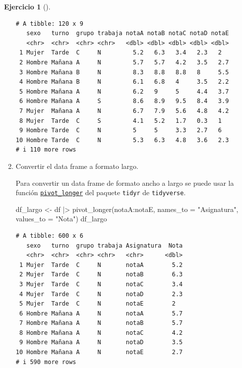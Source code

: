 \documentclass[
  a4paper,
]{scrreport}
\newenvironment{Shaded}{\begin{snugshade}}{\end{snugshade}}
\newcommand{\AttributeTok}[1]{\textcolor[rgb]{0.40,0.45,0.13}{#1}}
\newcommand{\FunctionTok}[1]{\textcolor[rgb]{0.28,0.35,0.67}{#1}}
\newcommand{\NormalTok}[1]{\textcolor[rgb]{0.00,0.23,0.31}{#1}}
\newcommand{\OtherTok}[1]{\textcolor[rgb]{0.00,0.23,0.31}{#1}}
\newcommand{\SpecialCharTok}[1]{\textcolor[rgb]{0.37,0.37,0.37}{#1}}
\newcommand{\StringTok}[1]{\textcolor[rgb]{0.13,0.47,0.30}{#1}}
\theoremstyle{definition}
\newtheorem{exercise}{Ejercicio}[chapter]
\theoremstyle{remark}
\begin{document}
\begin{exercise}[]
\begin{enumerate}
\begin{tcolorbox}
\begin{verbatim}
# A tibble: 120 x 9
   sexo   turno  grupo trabaja notaA notaB notaC notaD notaE
   <chr>  <chr>  <chr> <chr>   <dbl> <dbl> <dbl> <dbl> <dbl>
 1 Mujer  Tarde  C     N         5.2   6.3   3.4   2.3   2  
 2 Hombre Mañana A     N         5.7   5.7   4.2   3.5   2.7
 3 Hombre Mañana B     N         8.3   8.8   8.8   8     5.5
 4 Hombre Mañana B     N         6.1   6.8   4     3.5   2.2
 5 Hombre Mañana A     N         6.2   9     5     4.4   3.7
 6 Hombre Mañana A     S         8.6   8.9   9.5   8.4   3.9
 7 Mujer  Mañana A     N         6.7   7.9   5.6   4.8   4.2
 8 Mujer  Tarde  C     S         4.1   5.2   1.7   0.3   1  
 9 Hombre Tarde  C     N         5     5     3.3   2.7   6  
10 Hombre Tarde  C     N         5.3   6.3   4.8   3.6   2.3
# i 110 more rows
\end{verbatim}

  \end{tcolorbox}
\item
  Convertir el data frame a formato largo.

  \begin{tcolorbox}[enhanced jigsaw, breakable, toptitle=1mm, colbacktitle=quarto-callout-tip-color!10!white, rightrule=.15mm, opacityback=0, opacitybacktitle=0.6, titlerule=0mm, coltitle=black, colframe=quarto-callout-tip-color-frame, colback=white, bottomtitle=1mm, leftrule=.75mm, toprule=.15mm, title=\textcolor{quarto-callout-tip-color}{\faLightbulb}\hspace{0.5em}{Solución}, arc=.35mm, bottomrule=.15mm, left=2mm]

  Para convertir un data frame de formato ancho a largo se puede usar la
  función
  \href{https://tidyr.tidyverse.org/reference/pivot_longer.html}{\texttt{pivot\_longer}}
  del paquete \texttt{tidyr} de \texttt{tidyverse}.

\begin{Shaded}
\begin{Highlighting}[]
\NormalTok{df\_largo }\OtherTok{\textless{}{-}}\NormalTok{ df }\SpecialCharTok{|\textgreater{}} \FunctionTok{pivot\_longer}\NormalTok{(notaA}\SpecialCharTok{:}\NormalTok{notaE, }\AttributeTok{names\_to =} \StringTok{"Asignatura"}\NormalTok{, }\AttributeTok{values\_to =} \StringTok{"Nota"}\NormalTok{)}
\NormalTok{df\_largo}
\end{Highlighting}
\end{Shaded}

\begin{verbatim}
# A tibble: 600 x 6
   sexo   turno  grupo trabaja Asignatura  Nota
   <chr>  <chr>  <chr> <chr>   <chr>      <dbl>
 1 Mujer  Tarde  C     N       notaA        5.2
 2 Mujer  Tarde  C     N       notaB        6.3
 3 Mujer  Tarde  C     N       notaC        3.4
 4 Mujer  Tarde  C     N       notaD        2.3
 5 Mujer  Tarde  C     N       notaE        2  
 6 Hombre Mañana A     N       notaA        5.7
 7 Hombre Mañana A     N       notaB        5.7
 8 Hombre Mañana A     N       notaC        4.2
 9 Hombre Mañana A     N       notaD        3.5
10 Hombre Mañana A     N       notaE        2.7
# i 590 more rows
\end{verbatim}


\end{tcolorbox}
\end{enumerate}
\end{exercise}
\end{document}
